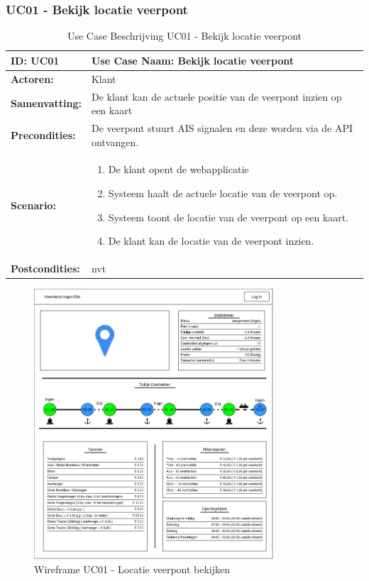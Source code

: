 \documentclass{article}
\begin{document}
\subsubsection{UC01 - Bekijk locatie veerpont}
\begin{table}[H]
    \centering
    \begin{tabularx}{\textwidth}{|l|X|}
        \hline
        \textbf{ID:} UC01 & \textbf{Use Case Naam:} Bekijk locatie veerpont  \\
        \hline
        \textbf{Actoren:} & Klant \\
        \hline
        \textbf{Samenvatting:}  & De klant kan de actuele positie van de veerpont inzien op een kaart \\
        \hline 
        \textbf{Precondities:} & De veerpont stuurt AIS signalen en deze worden via de API ontvangen. \\
        \hline
        \textbf{Scenario:} & \begin{enumerate}
            \item De klant opent de webapplicatie
            \item Systeem haalt de actuele locatie van de veerpont op.
            \item Systeem toont de locatie van de veerpont op een kaart.
            \item De klant kan de locatie van de veerpont inzien.
        \end{enumerate} \\
        \hline 
        \textbf{Postcondities:} & nvt \\ 
        \hline

    \end{tabularx}
    \caption{Use Case Beschrijving UC01 - Bekijk locatie veerpont}
\end{table}

\begin{figure}[H]
    \centering
    \includegraphics[width=0.8\textwidth]{images/wireframe_startpagina.png}
    \caption{Wireframe UC01 - Locatie veerpont bekijken}
    \label{fig:wf1}
\end{figure}
\end{document}
